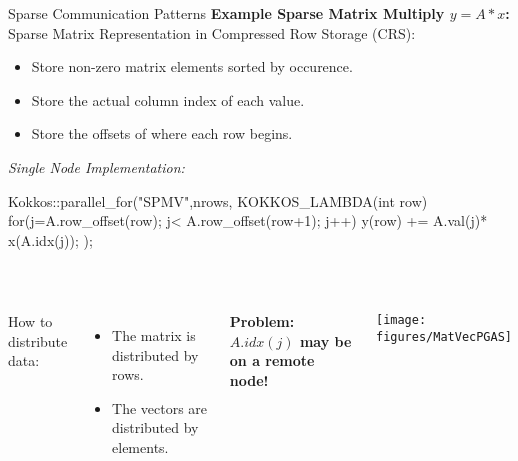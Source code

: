 \begin{frame}[fragile]{Sparse Communication Patterns}
  \textbf{Example Sparse Matrix Multiply $y = A*x$:}
  Sparse Matrix Representation in Compressed Row Storage (CRS):
  \begin{itemize}
    \item Store non-zero matrix elements sorted by occurence.
    \item Store the actual column index of each value.
    \item Store the offsets of where each row begins.
  \end{itemize}
  \vspace{3pt}
  \pause
    \textit{Single Node Implementation:}
    \begin{code}[keywords={for,RemoteSpace_t,RemoteView_t,parallel_for,Kokkos,View,Experimental,deep_copy,RangePolicy, KOKKOS_LAMBDA}]
      Kokkos::parallel_for("SPMV",nrows, KOKKOS_LAMBDA(int row) {
      for(j=A.row_offset(row); j< A.row_offset(row+1); j++)
      y(row) += A.val(j)* x(A.idx(j));
      });
    \end{code}\\
  \pause

    \begin{columns}[t,onlytextwidth]
     How to distribute data:
    \begin{itemize}
       \item The matrix is distributed by rows.
       \item The vectors are distributed by elements.
    \end{itemize}
    \textbf{Problem:$A.idx(j)$ may be on a remote node!}
    \begin{center}
      \texttt{[image: figures/MatVecPGAS]}
    \end{center}
  \end{columns}
\end{frame}


